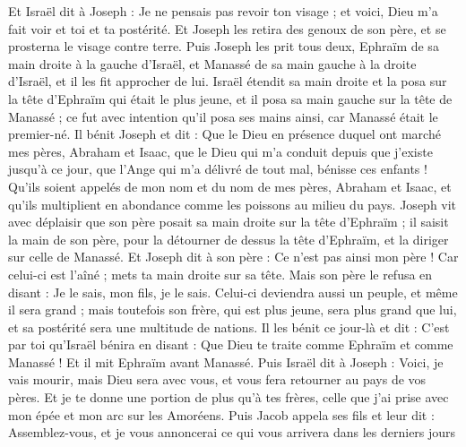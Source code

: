 \begin{multicols}{2}
Et Israël dit à Joseph : Je ne pensais pas revoir ton visage ; et voici, Dieu m'a fait voir et toi et ta postérité.
Et Joseph les retira des genoux de son père, et se prosterna le visage contre terre.
Puis Joseph les prit tous deux, Ephraïm de sa main droite à la gauche d'Israël, et Manassé de sa main gauche à la droite d'Israël, et il les fit approcher de lui.
Israël étendit sa main droite et la posa sur la tête d'Ephraïm qui était le plus jeune, et il posa sa main gauche sur la tête de Manassé ; ce fut avec intention qu'il posa ses mains ainsi, car Manassé était le premier-né.
Il bénit Joseph et dit : Que le Dieu en présence duquel ont marché mes pères, Abraham et Isaac, que le Dieu qui m'a conduit depuis que j'existe jusqu'à ce jour,
que l'Ange qui m'a délivré de tout mal, bénisse ces enfants ! Qu'ils soient appelés de mon nom et du nom de mes pères, Abraham et Isaac, et qu'ils multiplient en abondance comme les poissons au milieu du pays.
Joseph vit avec déplaisir que son père posait sa main droite sur la tête d'Ephraïm ; il saisit la main de son père, pour la détourner de dessus la tête d'Ephraïm, et la diriger sur celle de Manassé.
Et Joseph dit à son père : Ce n'est pas ainsi mon père ! Car celui-ci est l'aîné ; mets ta main droite sur sa tête.
Mais son père le refusa en disant : Je le sais, mon fils, je le sais. Celui-ci deviendra aussi un peuple, et même il sera grand ; mais toutefois son frère, qui est plus jeune, sera plus grand que lui, et sa postérité sera une multitude de nations.
Il les bénit ce jour-là et dit : C'est par toi qu'Israël bénira en disant : Que Dieu te traite comme Ephraïm et comme Manassé ! Et il mit Ephraïm avant Manassé.
Puis Israël dit à Joseph : Voici, je vais mourir, mais Dieu sera avec vous, et vous fera retourner au pays de vos pères.
Et je te donne une portion de plus qu'à tes frères, celle que j'ai prise avec mon épée et mon arc sur les Amoréens.
\VerseOne{}Puis Jacob appela ses fils et leur dit : Assemblez-vous, et je vous annoncerai ce qui vous arrivera dans les derniers jours
\end{multicols}
